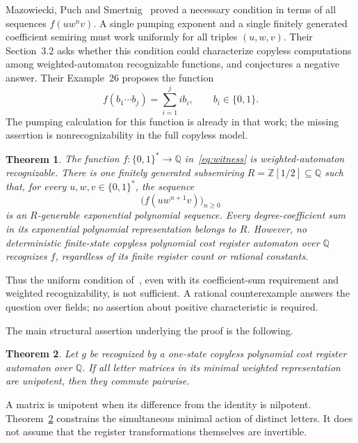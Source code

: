 \documentclass[acmlarge,screen,11pt,nonacm]{acmart}
\newcommand{\Q}{\mathbb{Q}}
\newcommand{\Z}{\mathbb{Z}}
\newtheorem{theorem}{Theorem}
\theoremstyle{definition}
\begin{document}
Mazowiecki, Puch and Smertnig~\cite{MPS26} proved a necessary condition in terms of all sequences $f(uw^n v)$. A single pumping exponent and a single finitely generated coefficient semiring must work uniformly for all triples $(u,w,v)$. Their Section~3.2 asks whether this condition could characterize copyless computations among weighted-automaton recognizable functions, and conjectures a negative answer. Their Example~26 proposes the function
\begin{equation}\label{eq:witness}
 f(b_1\cdots b_j)=\sum_{i=1}^{j}i b_i,\qquad b_i\in\{0,1\}.
\end{equation}
The pumping calculation for this function is already in that work; the missing assertion is nonrecognizability in the full copyless model.

\begin{theorem}\label{thm:main}
The function $f:\{0,1\}^*\to\Q$ in~\eqref{eq:witness} is weighted-automaton recognizable. There is one finitely generated subsemiring $R=\Z[1/2]\subseteq\Q$ such that, for every $u,w,v\in\{0,1\}^*$, the sequence
\[
 \bigl(f(uw^{n+1}v)\bigr)_{n\geq0}
\]
is an $R$-generable exponential polynomial sequence. Every degree-coefficient sum in its exponential polynomial representation belongs to $R$. However, no deterministic finite-state copyless polynomial cost register automaton over $\Q$ recognizes $f$, regardless of its finite register count or rational constants.
\end{theorem}

Thus the uniform condition of~\cite[Theorem~15]{MPS26}, even with its coefficient-sum requirement and weighted recognizability, is not sufficient. A rational counterexample answers the question over fields; no assertion about positive characteristic is required.

The main structural assertion underlying the proof is the following.
\begin{theorem}\label{thm:obstruction}
Let $g$ be recognized by a one-state copyless polynomial cost register automaton over $\Q$. If all letter matrices in its minimal weighted representation are unipotent, then they commute pairwise.
\end{theorem}
A matrix is unipotent when its difference from the identity is nilpotent. Theorem~\ref{thm:obstruction} constrains the simultaneous minimal action of distinct letters. It does not assume that the register transformations themselves are invertible.
\end{document}
